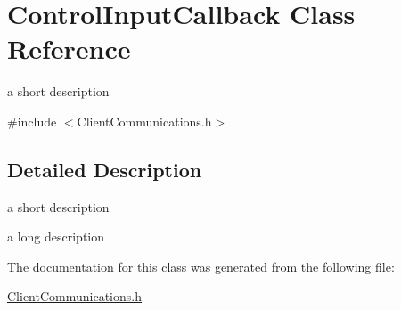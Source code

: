 \hypertarget{classControlInputCallback}{}\section{Control\+Input\+Callback Class Reference}
\label{classControlInputCallback}


a short description  




{\ttfamily \#include $<$Client\+Communications.\+h$>$}



\subsection{Detailed Description}
a short description 

a long description 

The documentation for this class was generated from the following file\+:\begin{DoxyCompactItemize}
\item 
\hyperlink{ClientCommunications_8h}{Client\+Communications.\+h}\end{DoxyCompactItemize}

